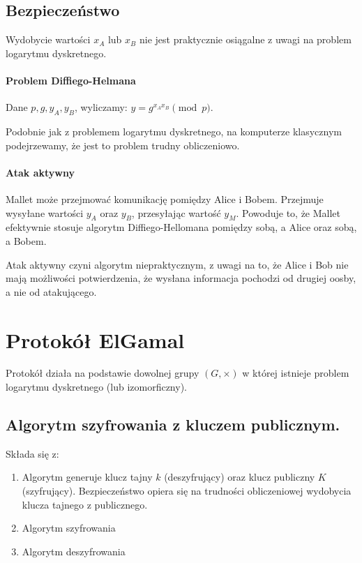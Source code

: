 \documentclass{report}
\begin{document}
\subsection{Bezpieczeństwo}

Wydobycie wartości $x_A$ lub $x_B$ nie jest praktycznie osiągalne z uwagi na problem logarytmu dyskretnego.


\paragraph{Problem Diffiego-Helmana}

Dane $p, g, y_A, y_B$, wyliczamy: $y = g^{x_A x_B} \pmod{p}$.

Podobnie jak z problemem logarytmu dyskretnego, na komputerze klasycznym podejrzewamy, że jest to problem trudny obliczeniowo.

\paragraph{Atak aktywny}

Mallet może przejmować komunikację pomiędzy Alice i Bobem. Przejmuje wysyłane wartości $y_A$ oraz $y_B$, przesyłając wartość $y_M$.
Powoduje to, że Mallet efektywnie stosuje algorytm Diffiego-Hellomana pomiędzy sobą, a Alice oraz sobą, a Bobem.

Atak aktywny czyni algorytm niepraktycznym, z uwagi na to, że Alice i Bob nie mają możliwości potwierdzenia, że wysłana informacja
pochodzi od drugiej oosby, a nie od atakującego.

\section{Protokół ElGamal}

Protokół działa na podstawie dowolnej grupy $(G, \times)$ w której istnieje problem logarytmu dyskretnego (lub izomorficzny).

\subsection{Algorytm szyfrowania z kluczem publicznym.}

Składa się z:

\begin{enumerate}
\item Algorytm generuje klucz tajny $k$ (deszyfrujący) oraz klucz publiczny $K$ (szyfrujący).
Bezpieczeństwo opiera się na trudności obliczeniowej wydobycia klucza tajnego z publicznego.
\item Algorytm szyfrowania
\item Algorytm deszyfrowania
\end{enumerate}
\end{document}
